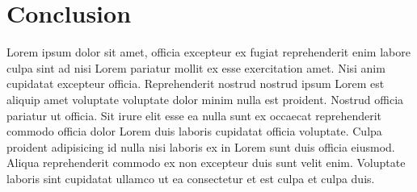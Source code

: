 \documentclass[conference]{IEEEtran}
\begin{document}
\section{Conclusion}
Lorem ipsum dolor sit amet, officia excepteur ex fugiat reprehenderit enim labore culpa sint ad nisi Lorem pariatur mollit ex esse exercitation amet. Nisi anim cupidatat excepteur officia. Reprehenderit nostrud nostrud ipsum Lorem est aliquip amet voluptate voluptate dolor minim nulla est proident. Nostrud officia pariatur ut officia. Sit irure elit esse ea nulla sunt ex occaecat reprehenderit commodo officia dolor Lorem duis laboris cupidatat officia voluptate. Culpa proident adipisicing id nulla nisi laboris ex in Lorem sunt duis officia eiusmod. Aliqua reprehenderit commodo ex non excepteur duis sunt velit enim. Voluptate laboris sint cupidatat ullamco ut ea consectetur et est culpa et culpa duis.



\end{document}
